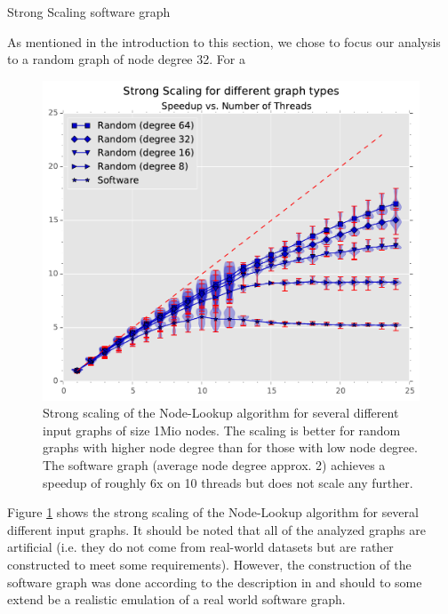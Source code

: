 \begin{invisible}

 Strong Scaling software graph 

\end{invisible}


 As mentioned in the introduction to this section, we chose to focus our analysis to a random graph of node degree 32.
	For a 
%
\begin{figure}[ht]
	\centering
	\includegraphics[width=\columnwidth]{plots/strongscaling_gtALL_n1000000.pdf}
	\caption{Strong scaling of the Node-Lookup algorithm for several different input graphs of size 1Mio nodes. The scaling is better for random graphs with higher node degree than for those with low node degree.
		The software graph (average node degree approx. 2) achieves a speedup of roughly 6x on 10 threads but does not scale any further.
}
	\label{fig:strongscaling_graphtypes}
\end{figure}
%
Figure \ref{fig:strongscaling_graphtypes} shows the strong scaling of the Node-Lookup algorithm for several different input graphs.
It should be noted that all of the analyzed graphs are artificial (i.e. they do not come from real-world datasets but are rather constructed to meet some requirements).
However, the construction of the software graph was done according to the description in \cite{musco2014generative} and should to some extend be a realistic emulation of a real world software graph. \\
